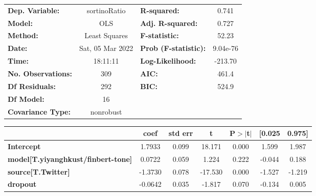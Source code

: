 \begin{center}
\begin{tabular}{lclc}
\toprule
\textbf{Dep. Variable:}                    &   sortinoRatio   & \textbf{  R-squared:         } &     0.741   \\
\textbf{Model:}                            &       OLS        & \textbf{  Adj. R-squared:    } &     0.727   \\
\textbf{Method:}                           &  Least Squares   & \textbf{  F-statistic:       } &     52.23   \\
\textbf{Date:}                             & Sat, 05 Mar 2022 & \textbf{  Prob (F-statistic):} &  9.04e-76   \\
\textbf{Time:}                             &     18:11:11     & \textbf{  Log-Likelihood:    } &   -213.70   \\
\textbf{No. Observations:}                 &         309      & \textbf{  AIC:               } &     461.4   \\
\textbf{Df Residuals:}                     &         292      & \textbf{  BIC:               } &     524.9   \\
\textbf{Df Model:}                         &          16      & \textbf{                     } &             \\
\textbf{Covariance Type:}                  &    nonrobust     & \textbf{                     } &             \\
\bottomrule
\end{tabular}
\begin{tabular}{lcccccc}
                                           & \textbf{coef} & \textbf{std err} & \textbf{t} & \textbf{P$> |$t$|$} & \textbf{[0.025} & \textbf{0.975]}  \\
\midrule
\textbf{Intercept}                         &       1.7933  &        0.099     &    18.171  &         0.000        &        1.599    &        1.987     \\
\textbf{model[T.yiyanghkust/finbert-tone]} &       0.0722  &        0.059     &     1.224  &         0.222        &       -0.044    &        0.188     \\
\textbf{source[T.Twitter]}                 &      -1.3730  &        0.078     &   -17.530  &         0.000        &       -1.527    &       -1.219     \\
\textbf{dropout}                           &      -0.0642  &        0.035     &    -1.817  &         0.070        &       -0.134    &        0.005     \\

\end{tabular}
\end{center}

